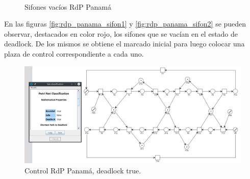 \begin{figure}[H]
	\centering
	\\
	\caption{Sifones vacíos RdP Panamá}
\end{figure}

En las figuras \ref{fig:rdp_panama_sifon1} y \ref{fig:rdp_panama_sifon2} se pueden observar, destacados en color rojo, los sifones que se vacían en el estado de deadlock. De los mismos se obtiene el marcado inicial para luego colocar una plaza de control correspondiente a cada uno.

\begin{figure}[H]
	\centering
	\includegraphics[width=\textwidth]{Figures/algoritmo2/panama_control_deadlock_true.png}
	\caption{Control RdP Panamá, deadlock true.}
	\label{fig:rdp_panama_deadlock_true}
  \end{figure}

